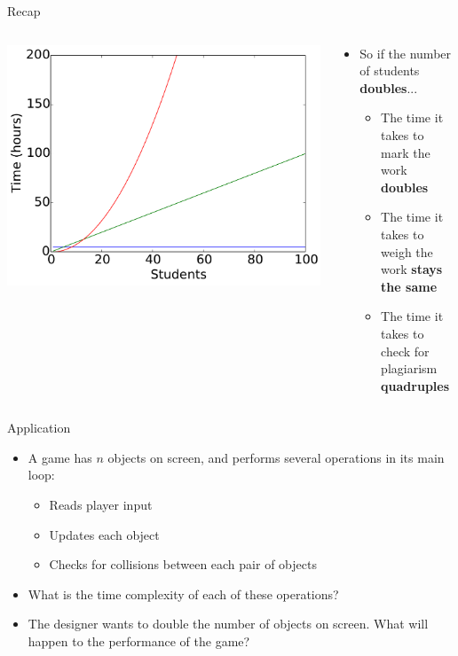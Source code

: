 \begin{frame}{Recap}
	\begin{columns}
		\begin{column}{0.47\textwidth}
			\includegraphics[width=\textwidth]{plot_all}
		\end{column}
		\begin{column}{0.47\textwidth}
			\begin{itemize}
				\item So if the number of students \textbf{doubles}... \pause
				\begin{itemize}
					\item The time it takes to mark the work \textbf{doubles} \pause
					\item The time it takes to weigh the work \textbf{stays the same} \pause
					\item The time it takes to check for plagiarism \textbf{quadruples}
				\end{itemize}
			\end{itemize}
		\end{column}
	\end{columns}
\end{frame}

\begin{frame}{Application}
	\begin{itemize}
		\item A game has $n$ objects on screen, and performs several operations in its main loop: \pause
			\begin{itemize}
				\item Reads player input \pause
				\item Updates each object \pause
				\item Checks for collisions between each pair of objects \pause
			\end{itemize}
		\item What is the time complexity of each of these operations?
		\item The designer wants to double the number of objects on screen.
			What will happen to the performance of the game?
	\end{itemize}
\end{frame}
